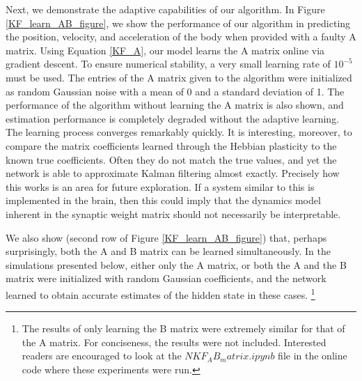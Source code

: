 Next, we demonstrate the adaptive capabilities of our algorithm. In Figure \ref{KF_learn_AB_figure}, we show the performance of our algorithm in predicting the position, velocity, and acceleration of the body when provided with a faulty A matrix. Using Equation \ref{KF_A}, our model learns the A matrix online via gradient descent. To ensure numerical stability, a very small learning rate of $10^{-5}$ must be used. The entries of the A matrix given to the algorithm were initialized as random Gaussian noise with a mean of 0 and a standard deviation of 1. The performance of the algorithm without learning the A matrix is also shown, and estimation performance is completely degraded without the adaptive learning. The learning process converges remarkably quickly. It is interesting, moreover, to compare the matrix coefficients learned through the Hebbian plasticity to the known true coefficients. Often they do not match the true values, and yet the network is able to approximate Kalman filtering almost exactly. Precisely how this works is an area for future exploration. %
If a system similar to this is implemented in the brain, then this could imply that the dynamics model inherent in the synaptic weight matrix should not necessarily be interpretable.

We also show (second row of Figure \ref{KF_learn_AB_figure}) that, perhaps surprisingly, both the A and B matrix can be learned simultaneously. In the simulations presented below, either only the A matrix, or both the A and the B matrix were initialized with random Gaussian coefficients, and the network learned to obtain accurate estimates of the hidden state in these cases. \footnote{The results of only learning the B matrix were extremely similar for that of the A matrix. For conciseness, the results were not included. Interested readers are encouraged to look at the $NKF_AB_matrix.ipynb$ file in the online code where these experiments were run.}


